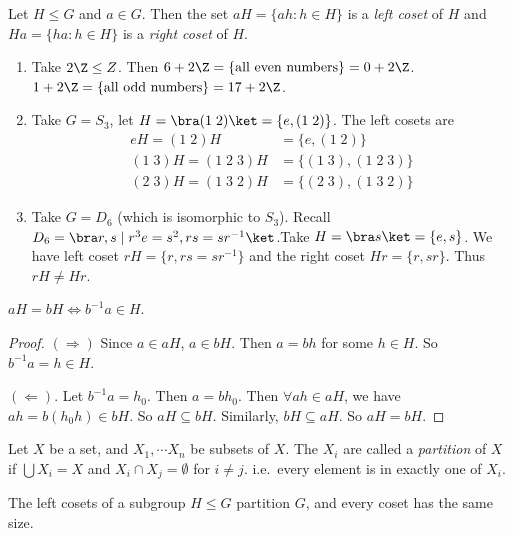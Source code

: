 \documentclass[a4paper]{article}
\begin{document}
\begin{defi}[Cosets]
  Let $H\leq G$ and $a\in G$. Then the set $aH =\{ah : h\in H\}$ is a \emph{left coset} of $H$ and $Ha = \{ha : h\in H\}$ is a \emph{right coset} of $H$.
\end{defi}
\begin{eg}\leavevmode
  \begin{enumerate}
    \item Take $2\Z \leq Z$. Then $6 + 2\Z = \{\text{all even numbers}\} = 0 + 2\Z$. $1 + 2\Z = \{\text{all odd numbers}\} = 17 + 2\Z$.
    \item Take $G = S_3$, let $H = \bra (1\; 2)\ket = \{e, (1\; 2)\}$. The left cosets are
      \begin{align*}
        eH = (1\; 2)H &= \{e, (1\; 2)\}\\
        (1\; 3)H = (1\; 2\; 3)H &= \{(1\; 3), (1\; 2\; 3)\}\\
        (2\; 3)H = (1\; 3\; 2)H &= \{(2\; 3), (1\; 3\; 2)\}
      \end{align*}
    \item Take $G = D_6$ (which is isomorphic to $S_3$). Recall $D_6 = \bra r, s \mid r^3 e = s^2, rs = sr^{-1}\ket$.Take $H = \bra s\ket = \{e, s\}$. We have left coset $rH = \{r, rs = sr^{-1}\}$ and the right coset $Hr = \{r, sr\}$. Thus $rH \not= Hr$.
  \end{enumerate}
\end{eg}

\begin{prop}
  $aH = bH \Leftrightarrow b^{-1}a\in H$.
\end{prop}
\begin{proof}
  $(\Rightarrow)$ Since $a\in aH$, $a\in bH$. Then $a = bh$ for some $h\in H$. So $b^{-1}a = h\in H$.

  $(\Leftarrow)$. Let $b^{-1}a = h_0$. Then $a = bh_0$. Then $\forall ah\in aH$, we have $ah = b(h_0h)\in bH$. So $aH \subseteq bH$. Similarly, $bH\subseteq aH$. So $aH = bH$.
\end{proof}

\begin{defi}[Partition]
  Let $X$ be a set, and $X_1, \cdots X_n$ be subsets of $X$. The $X_i$ are called a \emph{partition} of $X$ if $\bigcup X_i = X$ and $X_i\cap X_j = \emptyset$ for $i\not= j$. i.e.\ every element is in exactly one of $X_i$.
\end{defi}

\begin{lemma}
  The left cosets of a subgroup $H\leq G$ partition $G$, and every coset has the same size.
\end{lemma}
\end{document}
